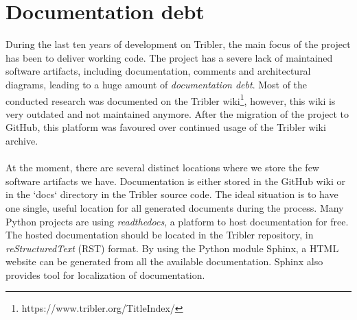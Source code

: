 
\section{Documentation debt}
\label{sec:software-artifacts}
During the last ten years of development on Tribler, the main focus of the project has been to deliver working code. The project has a severe lack of maintained software artifacts, including documentation, comments and architectural diagrams, leading to a huge amount of \emph{documentation debt}. Most of the conducted research was documented on the Tribler wiki\footnote{https://www.tribler.org/TitleIndex/}, however, this wiki is very outdated and not maintained anymore. After the migration of the project to GitHub, this platform was favoured over continued usage of the Tribler wiki archive.\\\\
At the moment, there are several distinct locations where we store the few software artifacts we have. Documentation is either stored in the GitHub wiki or in the `docs` directory in the Tribler source code. The ideal situation is to have one single, useful location for all generated documents during the process. Many Python projects are using \emph{readthedocs}, a platform to host documentation for free. The hosted documentation should be located in the Tribler repository, in \emph{reStructuredText} (RST) format. By using the Python module Sphinx, a HTML website can be generated from all the available documentation. Sphinx also provides tool for localization of documentation.\\

